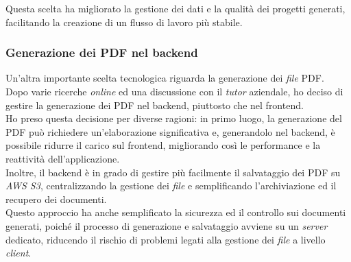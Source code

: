 \noindent Questa scelta ha migliorato la gestione dei dati e la qualità dei progetti generati, facilitando la creazione di un flusso di lavoro più stabile.

\subsubsection{Generazione dei PDF nel \gls{backend}}

Un'altra importante scelta tecnologica riguarda la generazione dei \textit{file} PDF.\\
Dopo varie ricerche \textit{online} ed una discussione con il \textit{tutor} aziendale, ho deciso di gestire la generazione dei PDF nel \gls{backend}, piuttosto che nel \gls{frontend}.\\

\noindent Ho preso questa decisione per diverse ragioni: in primo luogo, la generazione del PDF può richiedere un'elaborazione significativa e, generandolo nel \gls{backend}, è possibile ridurre il carico sul \gls{frontend}, migliorando così le performance e la reattività dell'applicazione.\\
Inoltre, il \gls{backend} è in grado di gestire più facilmente il salvataggio dei PDF su \textit{AWS S3}, centralizzando la gestione dei \textit{file} e semplificando l'archiviazione ed il recupero dei documenti.\\

\noindent Questo approccio ha anche semplificato la sicurezza ed il controllo sui documenti generati, poiché il processo di generazione e salvataggio avviene su un \textit{server} dedicato, riducendo il rischio di problemi legati alla gestione dei \textit{file} a livello \textit{client}.
